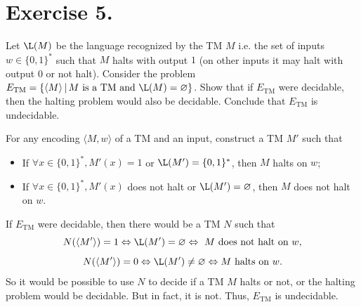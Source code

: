 \section{Exercise 5.} Let $\L(M)$ be the language recognized by the TM $M$ i.e. the set of inputs $w\in\{0,1\}^*$ such that $M$ halts with output $1$ (on other inputs it may halt with output 0 or not halt). Consider the problem $E_\text{TM} = \{\langle M\rangle \,|\, M \text{ is a TM and } \L(M)=\varnothing\}$. Show that if $E_\text{TM}$ were decidable, then the halting problem would also be decidable. Conclude that $E_\text{TM}$ is undecidable.

For any encoding $\langle M,w\rangle$ of a TM and an input, construct a TM $M'$ such that
\begin{itemize}
  \item If $\forall x\in \{0,1\}^*, M'(x) = 1$ or $\L(M') = \{0,1\}^*$, then $M$ halts on $w$;
  \item If $\forall x\in \{0,1\}^*, M'(x)$ does not halt or $\L(M') = \varnothing$, then $M$ does not halt on $w$.
\end{itemize}

If $E_\text{TM}$ were decidable, then there would be a TM $N$ such that
$$N(\langle M'\rangle) = 1 \Leftrightarrow \L(M') = \varnothing \Leftrightarrow \text{ $M$ does not halt on $w$},$$
$$N(\langle M'\rangle) = 0 \Leftrightarrow \L(M') \neq \varnothing \Leftrightarrow \text{$M$ halts on $w$}.$$
So it would be possible to use $N$ to decide if a TM $M$ halts or not, or the halting problem would be decidable. But in fact, it is not. Thus, $E_\text{TM}$ is undecidable.
